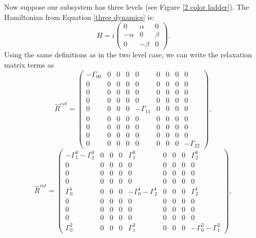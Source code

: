 Now suppose our subsystem has three levels (see Figure \ref{2 color ladder}). The Hamiltonian from Equation \ref{three dynamics} is:
\begin{equation}
H
=
i\left(
\begin{array}{ccc}
0 & \alpha & 0 \\
-\alpha & 0 & \beta \\
0 & -\beta & 0
\end{array}
\right).
\label{Hilbert3}
\end{equation}
Using the same definitions as in the two level case, we can write the relaxation matrix terms as
\begin{equation}
\hat{R}^{ext}
=
\left(
\begin{array}{ccccccccc}
-\Gamma_{00} & 0 & 0 & 0 & 0 & 0 & 0 & 0 & 0 \\
0 & 0 & 0 & 0 & 0 & 0 & 0 & 0 & 0 \\
0 & 0 & 0 & 0 & 0 & 0 & 0 & 0 & 0 \\
0 & 0 & 0 & 0 & 0 & 0 & 0 & 0 & 0 \\
0 & 0 & 0 & 0 & -\Gamma_{11} & 0 & 0 & 0 & 0 \\
0 & 0 & 0 & 0 & 0 & 0 & 0 & 0 & 0 \\
0 & 0 & 0 & 0 & 0 & 0 & 0 & 0 & 0 \\
0 & 0 & 0 & 0 & 0 & 0 & 0 & 0 & 0 \\
0 & 0 & 0 & 0 & 0 & 0 & 0 & 0 & -\Gamma_{22}
\end{array}
\right),
\label{decay3}
\end{equation}
\begin{equation}
\hat{R}^{int}
=
\left(
\begin{array}{ccccccccc}
-\Gamma^{0}_{1}-\Gamma^{0}_{2} & 0 & 0 & 0 & \Gamma^{0}_{1} & 0 & 0 & 0 & \Gamma^{0}_{2} \\
0 & 0 & 0 & 0 & 0 & 0 & 0 & 0 & 0 \\
0 & 0 & 0 & 0 & 0 & 0 & 0 & 0 & 0 \\
0 & 0 & 0 & 0 & 0 & 0 & 0 & 0 & 0 \\
\Gamma^{1}_{0} & 0 & 0 & 0 & -\Gamma^{1}_{0}-\Gamma^{1}_{2} & 0 & 0 & 0 & \Gamma^{1}_{2} \\
0 & 0 & 0 & 0 & 0 & 0 & 0 & 0 & 0 \\
0 & 0 & 0 & 0 & 0 & 0 & 0 & 0 & 0 \\
0 & 0 & 0 & 0 & 0 & 0 & 0 & 0 & 0 \\
\Gamma^{2}_{0} & 0 & 0 & 0 & \Gamma^{2}_{1} & 0 & 0 & 0 & -\Gamma^{2}_{0}-\Gamma^{2}_{1}
\end{array}
\right),
\label{exchange3}
\end{equation}
